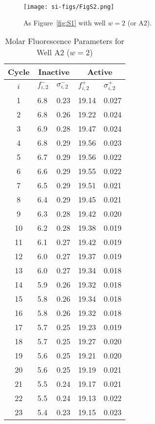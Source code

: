                 \begin{figure}
                    \centering
                    \texttt{[image: si-figs/FigS2.png]}
                    \caption{
                        As Figure~\ref{fig:S1} with well $w=2$ (or A2).
                    }
                \end{figure}
                \clearpage
    \begin{table}
        \caption{Molar Fluorescence Parameters for Well A2 ($w=2$)}
        \centering
        \begin{tabular}{c|ll|ll}
            Cycle & \multicolumn{2}{c|}{Inactive} & \multicolumn{2}{c}{Active} \\
            \hline
            $i$ & $f_{i,2}^{-}$ & $\sigma_{i,2}^{-}$ &  $f_{i,2}^{+}$ & $\sigma_{i,2}^{+}$ \\
            \hline
    1 & 6.8 & 0.23 & 19.14 & 0.027 \\
2 & 6.8 & 0.26 & 19.22 & 0.024 \\
3 & 6.9 & 0.28 & 19.47 & 0.024 \\
4 & 6.8 & 0.29 & 19.56 & 0.023 \\
5 & 6.7 & 0.29 & 19.56 & 0.022 \\
6 & 6.6 & 0.29 & 19.55 & 0.022 \\
7 & 6.5 & 0.29 & 19.51 & 0.021 \\
8 & 6.4 & 0.29 & 19.45 & 0.021 \\
9 & 6.3 & 0.28 & 19.42 & 0.020 \\
10 & 6.2 & 0.28 & 19.38 & 0.019 \\
11 & 6.1 & 0.27 & 19.42 & 0.019 \\
12 & 6.0 & 0.27 & 19.37 & 0.019 \\
13 & 6.0 & 0.27 & 19.34 & 0.018 \\
14 & 5.9 & 0.26 & 19.32 & 0.018 \\
15 & 5.8 & 0.26 & 19.34 & 0.018 \\
16 & 5.8 & 0.26 & 19.32 & 0.018 \\
17 & 5.7 & 0.25 & 19.23 & 0.019 \\
18 & 5.7 & 0.25 & 19.27 & 0.020 \\
19 & 5.6 & 0.25 & 19.21 & 0.020 \\
20 & 5.6 & 0.25 & 19.19 & 0.021 \\
21 & 5.5 & 0.24 & 19.17 & 0.021 \\
22 & 5.5 & 0.24 & 19.13 & 0.022 \\
23 & 5.4 & 0.23 & 19.15 & 0.023 \\

\end{tabular}
\end{table}
